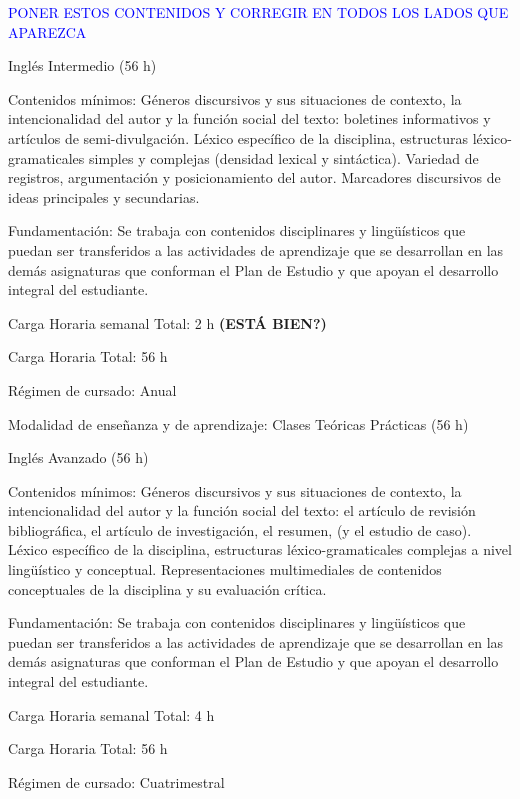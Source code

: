 \documentclass[a4paper, 12pt]{article}
\begin{document}
\textcolor{blue}{PONER ESTOS CONTENIDOS  Y CORREGIR EN TODOS LOS LADOS QUE APAREZCA }


Inglés Intermedio (56 h)

 

Contenidos mínimos: Géneros discursivos y sus situaciones de contexto, la intencionalidad del autor y la función social del texto: boletines informativos y artículos de semi-divulgación. Léxico específico de la disciplina, estructuras léxico-gramaticales simples y complejas (densidad lexical y sintáctica). Variedad de registros, argumentación y posicionamiento del autor. Marcadores discursivos de ideas principales y secundarias.

 

Fundamentación: Se trabaja con contenidos disciplinares y lingüísticos que puedan ser transferidos a las actividades de aprendizaje que se desarrollan en las demás asignaturas que conforman el Plan de Estudio y que apoyan el desarrollo integral del estudiante.

 

Carga Horaria semanal Total: 2 h  \textbf{(ESTÁ BIEN?)}

Carga Horaria Total: 56 h

Régimen de cursado: Anual

Modalidad de enseñanza y de aprendizaje: Clases Teóricas Prácticas (56 h)

 

Inglés Avanzado (56 h)

 

Contenidos mínimos: Géneros discursivos y sus situaciones de contexto, la intencionalidad del autor y la función social del texto: el artículo de revisión bibliográfica, el artículo de investigación, el resumen, (y el estudio de caso). Léxico específico de la disciplina, estructuras léxico-gramaticales complejas a nivel lingüístico y conceptual. Representaciones multimediales de contenidos conceptuales de la disciplina y su evaluación crítica.


Fundamentación: Se trabaja con contenidos disciplinares y lingüísticos que puedan ser transferidos a las actividades de aprendizaje que se desarrollan en las demás asignaturas que conforman el Plan de Estudio y que apoyan el desarrollo integral del estudiante.

 

Carga Horaria semanal Total: 4 h

Carga Horaria Total: 56 h

Régimen de cursado: Cuatrimestral
\end{document}
